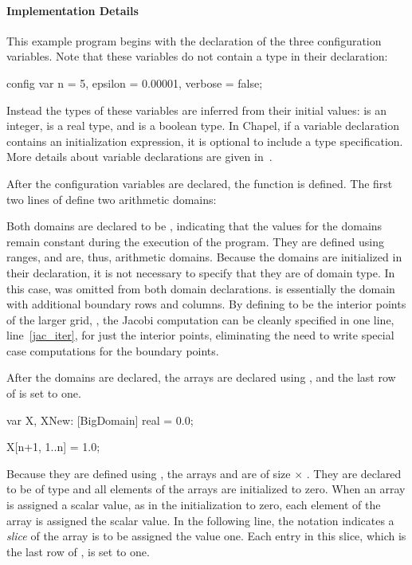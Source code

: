 \paragraph{Implementation Details}
This example program begins with the declaration of the three configuration
variables.  Note that these variables do not contain a type in their declaration: 
\begin{chapel}
config var n = 5,
           epsilon = 0.00001,
           verbose = false;
\end{chapel}
Instead the types of these variables are inferred  
from their initial values:  is an integer,  is a real
type, and  is a boolean type.  In Chapel, if a variable declaration
contains an initialization expression, it is optional to include a type specification.
More details about variable declarations are given in~.

After the configuration variables are declared, the  function
is defined.  The first two lines of  define two arithmetic domains:
\begin{chapel}
def main() {                       
  const ProblemSpace = [1..n, 1..n],
        BigDomain = [0..n+1, 0..n+1];
\end{chapel}
Both domains are declared to be , indicating that the
values for the domains remain constant during the execution of the
program.  They are defined using ranges, and are, thus, arithmetic
domains.  Because the domains are initialized in their declaration, it
is not necessary to specify that they are of domain type.  In this
case,
 was omitted from both domain declarations.  
 is essentially the  
domain with additional 
boundary rows and columns.  By defining  to be the interior
points of the larger grid, , the Jacobi computation can be cleanly 
specified in one line, line~\ref{jac_iter}, for just the interior points, 
eliminating the need to write special case computations for the boundary points.

After the domains are declared, the arrays are declared using ,
and the last row of  is set to one.
\begin{chapel}
  var X, XNew: [BigDomain] real = 0.0;

  X[n+1, 1..n] = 1.0;
\end{chapel}
Because they are defined using , the
arrays  and  are of size  $\times$ .  
They are declared to be of type  and all elements of the arrays
are initialized to zero.  When an array is assigned a scalar value, as in the
initialization to zero, each element of the array is assigned
 the scalar value.  
In the following line, the notation  indicates a {\em slice}
of the array  is to be assigned the value one.  Each entry in this slice,
which is the last row of , is set to one.

